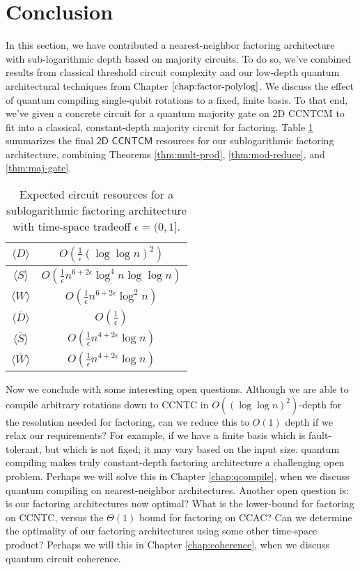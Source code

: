 \section{Conclusion}
\label{sec:fsl-conclude}

In this section, we have contributed a nearest-neighbor factoring architecture with
sub-logarithmic depth based on majority circuits. To do so, we've combined results from classical threshold
circuit complexity and our low-depth quantum architectural techniques from
Chapter $\ref{chap:factor-polylog}$.
We discuss the effect of quantum compiling single-qubit rotations to a fixed, finite basis.
To that end, we've given a concrete circuit for
a quantum majority gate on \textsf{2D CCNTCM} to fit into a classical, constant-depth majority circuit
for factoring. Table \ref{tab:sublog-resources} summarizes the final $\textsf{2D CCNTCM}$ resources for our sublogarithmic
factoring architecture, combining Theorems \ref{thm:mult-prod}, \ref{thm:mod-reduce}, and \ref{thm:maj-gate}.

\begin{table}[htb!]
\begin{tabular}{c|c|}
\hline
$\langle D \rangle$ & $O(\frac{1}{\epsilon}(\log\log n)^2)$ \\
\hline
$\langle S \rangle$ & $O(\frac{1}{\epsilon}n^{6 + 2\epsilon}\log^4 n\log\log n)$ \\
\hline
$\langle W \rangle$ & $O(\frac{1}{\epsilon}n^{6 + 2\epsilon}\log^2 n)$ \\
\hline
$\langle \overline{D} \rangle$ & $O(\frac{1}{\epsilon})$ \\
\hline
$\langle \overline{S} \rangle$ & $O(\frac{1}{\epsilon}n^{4+2\epsilon}\log n)$ \\
\hline
$\langle \overline{W} \rangle$ & $O(\frac{1}{\epsilon}n^{4+2\epsilon}\log n)$ \\
\hline
\end{tabular}
\caption{Expected circuit resources for a sublogarithmic factoring architecture with time-space tradeoff $\epsilon = (0,1]$.}
\label{tab:sublog-resources}
\end{table}

Now we conclude with some interesting open questions.
Although we are able to compile arbitrary rotations down to \textsf{CCNTC} in $O((\log \log n)^2)$-depth
for the resolution needed for factoring, can we reduce this to $O(1)$ depth if we relax our
requirements? For example, if we have a finite basis which is fault-tolerant, but which is not fixed;
it may vary based on the input size. quantum compiling makes truly constant-depth factoring architecture a challenging
open problem. Perhaps we will solve this in Chapter \ref{chap:qcompile}, when we discuss quantum compiling on
nearest-neighbor architectures.
Another open question is: is our factoring architectures now optimal?
What is the lower-bound for factoring on \textsf{CCNTC}, versus the $\Theta(1)$ bound for factoring on \textsf{CCAC}?
Can we determine the optimality of our factoring architectures using some other time-space product?
Perhaps we will this in Chapter \ref{chap:coherence}, when we discuss quantum circuit coherence. 


